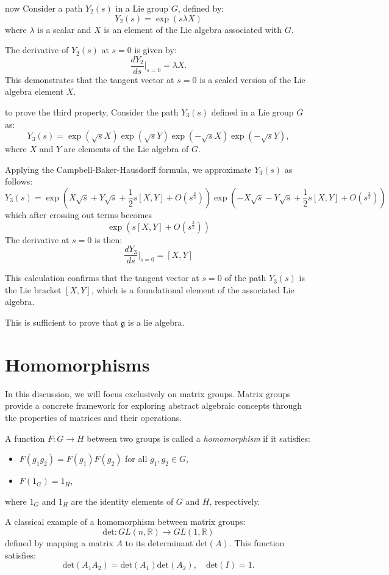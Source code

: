 \documentclass{article}
\begin{document}
now Consider a path \( Y_2(s) \) in a Lie group \( G \), defined by:
\[
Y_2(s) = \exp(s \lambda X)
\]
where \( \lambda \) is a scalar and \( X \) is an element of the Lie algebra associated with \( G \).

The derivative of \( Y_2(s) \) at \( s = 0 \) is given by:
\[
\frac{dY_2}{ds}\bigg|_{s=0} = \lambda X.
\]
This demonstrates that the tangent vector at \( s = 0 \) is a scaled version of the Lie algebra element \( X \).

to prove the third property, Consider the path \( Y_3(s) \) defined in a Lie group \( G \) as:
\[
Y_3(s) = \exp( \sqrt{s} X) \exp( \sqrt{s} Y) \exp(- \sqrt{s}X) \exp(-\sqrt{s}Y),
\]
where \( X \) and \( Y \) are elements of the Lie algebra of \( G \).

Applying the Campbell-Baker-Hausdorff formula, we approximate \( Y_3(s) \) as follows:
\[
    Y_3(s) = \exp \left(X \sqrt{s} + Y \sqrt{s} + \frac{1}{2} s [X,Y] + O(s^{\frac{3}{2}}) \right) \exp \left( -X \sqrt{s} - Y \sqrt{s} + \frac{1}{2} s [X,Y] + O(s^{\frac{3}{2}}) \right)
\]
which after crossing out terms becomes 
\[ \exp \left( s[X,Y] + O(s^{\frac{3}{2}}) \right) \]
The derivative at \( s = 0 \) is then:
\[
\frac{dY_3}{ds}\bigg|_{s=0} = [X, Y]
\]

This calculation confirms that the tangent vector at \( s = 0 \) of the path \( Y_3(s) \) is the Lie bracket \([X, Y]\), which is a foundational element of the associated Lie algebra.  

This is sufficient to prove that \( \mathfrak{g} \) is a lie algebra. 

\section{Homomorphisms}
In this discussion, we will focus exclusively on matrix groups. Matrix groups provide a concrete framework for exploring abstract algebraic concepts through the properties of matrices and their operations.

A function \( F: G \to H \) between two groups is called a \emph{homomorphism} if it satisfies:
\begin{itemize}
    \item \( F(g_1 g_2) = F(g_1) F(g_2) \) for all \( g_1, g_2 \in G \),
    \item \( F(1_G) = 1_H \),
\end{itemize}
where \( 1_G \) and \( 1_H \) are the identity elements of \( G \) and \( H \), respectively.

A classical example of a homomorphism between matrix groups:
\[
\text{det}: GL(n, \mathbb{R}) \to GL(1, \mathbb{R})
\]
defined by mapping a matrix \( A \) to its determinant \( \text{det}(A) \). This function satisfies:
\[
\text{det}(A_1 A_2) = \text{det}(A_1) \text{det}(A_2), \quad \text{det}(I) = 1.
\]
\end{document}
